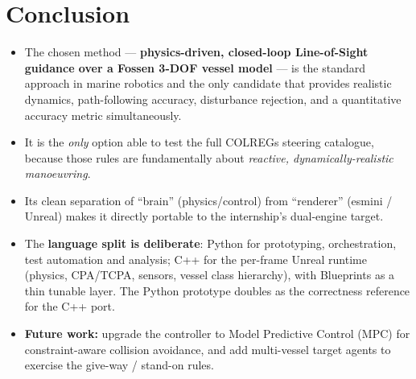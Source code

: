 \documentclass[11pt]{article}
\begin{document}
\section{Conclusion}
\begin{itemize}[leftmargin=1.6em]
    \item The chosen method --- \textbf{physics-driven, closed-loop Line-of-Sight guidance over a
    Fossen 3-DOF vessel model} --- is the standard approach in marine robotics and the only candidate
    that provides realistic dynamics, path-following accuracy, disturbance rejection, and a quantitative
    accuracy metric simultaneously.
    \item It is the \emph{only} option able to test the full COLREGs steering catalogue, because those
    rules are fundamentally about \emph{reactive, dynamically-realistic manoeuvring}.
    \item Its clean separation of ``brain'' (physics/control) from ``renderer'' (esmini / Unreal)
    makes it directly portable to the internship's dual-engine target.
    \item The \textbf{language split is deliberate}: Python for prototyping, orchestration, test
    automation and analysis; C++ for the per-frame Unreal runtime (physics, CPA/TCPA, sensors,
    vessel class hierarchy), with Blueprints as a thin tunable layer. The Python prototype doubles as
    the correctness reference for the C++ port.
    \item \textbf{Future work:} upgrade the controller to Model Predictive Control (MPC) for constraint-aware
    collision avoidance, and add multi-vessel target agents to exercise the give-way / stand-on rules.
\end{itemize}
\end{document}
